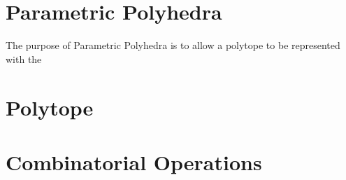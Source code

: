 \cite{Pasko_Adzhiev_Comninos_2008}


\section{Parametric Polyhedra}

The purpose of Parametric Polyhedra is to allow a polytope to
be represented with the 



\section{Polytope}


\section{Combinatorial Operations}




